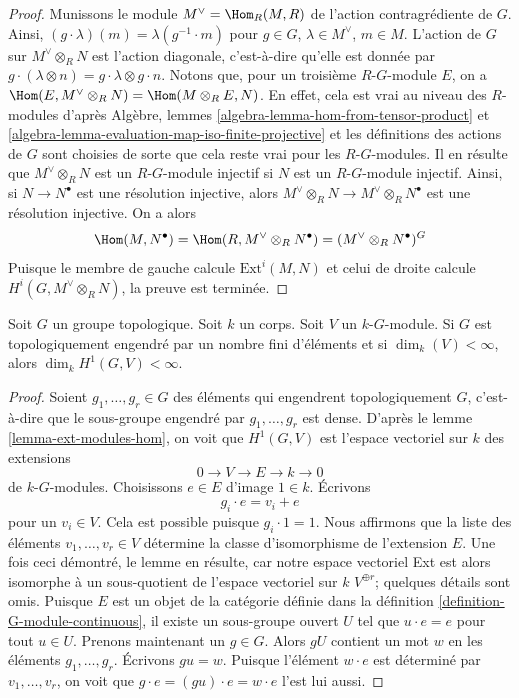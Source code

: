 \begin{proof}
Munissons le module $M^\vee = \Hom_R(M, R)$ de l'action contragr\'ediente
de $G$. Ainsi, $(g \cdot \lambda)(m) = \lambda(g^{-1} \cdot m)$
pour $g \in G$, $\lambda \in M^\vee$, $m \in M$. L'action de $G$ sur
$M^\vee \otimes_R N$ est l'action diagonale, c'est-\`a-dire qu'elle est donn\'ee par
$g \cdot (\lambda \otimes n) = g \cdot \lambda \otimes g \cdot n$.
Notons que, pour un troisi\`eme $R\text{-}G$-module $E$, on a
$\Hom(E, M^\vee \otimes_R N) = \Hom(M \otimes_R E, N)$.
En effet, cela est vrai au niveau des $R$-modules d'apr\`es
Alg\`ebre, lemmes \ref{algebra-lemma-hom-from-tensor-product} et
\ref{algebra-lemma-evaluation-map-iso-finite-projective}
et les d\'efinitions des actions de $G$ sont choisies de sorte que cela
reste vrai pour les $R\text{-}G$-modules. Il en r\'esulte que
$M^\vee \otimes_R N$ est un $R\text{-}G$-module injectif
si $N$ est un $R\text{-}G$-module injectif. Ainsi, si
$N \to N^\bullet$ est une r\'esolution injective, alors
$M^\vee \otimes_R N \to M^\vee \otimes_R N^\bullet$
est une r\'esolution injective. On a alors
$$
\Hom(M, N^\bullet) = \Hom(R, M^\vee \otimes_R N^\bullet) =
(M^\vee \otimes_R N^\bullet)^G
$$
Puisque le membre de gauche calcule $\text{Ext}^i(M, N)$ et celui de droite
calcule $H^i(G, M^\vee \otimes_R N)$, la preuve est termin\'ee.
\end{proof}

\begin{lemma}
\label{lemma-finite-dim-group-cohomology}
Soit $G$ un groupe topologique. Soit $k$ un corps.
Soit $V$ un $k\text{-}G$-module.
Si $G$ est topologiquement engendr\'e par un nombre fini d'\'el\'ements et si
$\dim_k(V) < \infty$, alors $\dim_k H^1(G, V) < \infty$.
\end{lemma}

\begin{proof}
Soient $g_1, \ldots, g_r \in G$ des \'el\'ements qui engendrent topologiquement $G$,
c'est-\`a-dire que le sous-groupe engendr\'e par $g_1, \ldots, g_r$ est dense.
D'apr\`es le lemme \ref{lemma-ext-modules-hom},
on voit que $H^1(G, V)$ est l'espace vectoriel sur $k$ des extensions
$$
0 \to V \to E \to k \to 0
$$
de $k\text{-}G$-modules. Choisissons $e \in E$ d'image $1 \in k$.
\'Ecrivons
$$
g_i \cdot e = v_i + e
$$
pour un $v_i \in V$. Cela est possible puisque $g_i \cdot 1 = 1$.
Nous affirmons que la liste des \'el\'ements $v_1, \ldots, v_r \in V$
d\'etermine la classe d'isomorphisme de l'extension $E$.
Une fois ceci d\'emontr\'e, le lemme en r\'esulte, car notre espace vectoriel
Ext est alors isomorphe \`a un sous-quotient de l'espace vectoriel sur $k$
$V^{\oplus r}$; quelques d\'etails sont omis.
Puisque $E$ est un objet de la cat\'egorie d\'efinie dans la
d\'efinition \ref{definition-G-module-continuous},
il existe un sous-groupe ouvert $U$ tel que
$u \cdot e = e$ pour tout $u \in U$.
Prenons maintenant un $g \in G$. Alors $gU$ contient un mot $w$ en
les \'el\'ements $g_1, \ldots, g_r$.
\'Ecrivons $gu = w$. Puisque l'\'el\'ement $w \cdot e$ est d\'etermin\'e par
$v_1, \ldots, v_r$, on voit que $g \cdot e = (gu) \cdot e = w \cdot e$
l'est lui aussi.
\end{proof}

